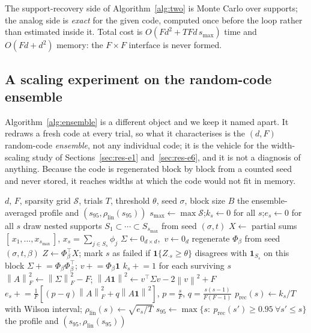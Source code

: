 \documentclass[preprint,12pt]{elsarticle}
\theoremstyle{definition}
\newcommand{\norm}[1]{\left\lVert #1 \right\rVert}
\begin{document}
The support-recovery side of Algorithm~\ref{alg:two} is Monte Carlo over supports; the analog
side is \emph{exact} for the given code, computed once before the loop rather than estimated
inside it. Total cost is $O(Fd^2+TFd\,s_{\max})$ time and $O(Fd+d^2)$ memory: the $F\times F$
interface is never formed.

\subsection{A scaling experiment on the random-code ensemble}
\label{sec:alg-ensemble}

Algorithm~\ref{alg:ensemble} is a different object and we keep it named apart. It redraws a
fresh code at every trial, so what it characterises is the $(d,F)$ random-code \emph{ensemble},
not any individual code; it is the vehicle for the width-scaling study of
Sections~\ref{sec:res-e1} and~\ref{sec:res-e6}, and it is not a diagnosis of anything. Because
the code is regenerated block by block from a counted seed and never stored, it reaches widths
at which the code would not fit in memory.

\begin{algorithm}[t]
\caption{\textsc{EnsembleScaling} --- the same two criteria, averaged over random codes}
\label{alg:ensemble}
\begin{algorithmic}[1]
\Require $d$, $F$, sparsity grid $\mathcal S$, trials $T$, threshold $\theta$, seed $\sigma$,
  block size $B$
\Ensure the ensemble-averaged profile and $(s_{95},\rho_{\mathrm{lin}}(s_{95}))$
\State $s_{\max}\gets\max\mathcal S$;\quad $k_s\gets0$ for all $s$;\quad $e_s\gets0$ for all $s$
  \State draw nested supports $S_1\subset\cdots\subset S_{s_{\max}}$ from seed $(\sigma,t)$
  \State $X\gets$ partial sums $[\,x_1,\dots,x_{s_{\max}}\,]$, $x_s=\sum_{j\in S_s}\phi_j$
  \State $\Sigma\gets 0_{d\times d}$,\ $v\gets 0_d$
    \State regenerate $\Phi_\beta$ from seed $(\sigma,t,\beta)$ 
    \State $Z\gets\Phi_\beta^{\top}X$; mark $s$ as failed if
      $\mathbf 1\{Z_{\cdot s}\ge\theta\}$ disagrees with $\mathbf 1_{S_s}$ on this block
    \State $\Sigma\mathrel{+}=\Phi_\beta\Phi_\beta^{\top}$;\quad
           $v\mathrel{+}=\Phi_\beta\mathbf 1$
  \EndFor
  \State $k_s\mathrel{+}=1$ for each surviving $s$
  \State $\norm{A}_F^2\gets\norm{\Sigma}_F^2-F$;\quad
         $\norm{A\mathbf 1}^2\gets v^{\top}\Sigma v-2\norm{v}^2+F$
  \State $e_s\mathrel{+}=\frac1F\!\left[(p-q)\norm{A}_F^2+q\norm{A\mathbf 1}^2\right]$,
    $p=\tfrac sF$, $q=\tfrac{s(s-1)}{F(F-1)}$ 
\EndFor
\State $p_{\mathrm{rec}}(s)\gets k_s/T$ with Wilson interval;\quad
       $\rho_{\mathrm{lin}}(s)\gets\sqrt{e_s/T}$
\State $s_{95}\gets\max\{s:\ p_{\mathrm{rec}}(s')\ge0.95\ \forall s'\le s\}$
\State \Return the profile and $(s_{95},\rho_{\mathrm{lin}}(s_{95}))$
\end{algorithmic}
\end{algorithm}
\end{document}

